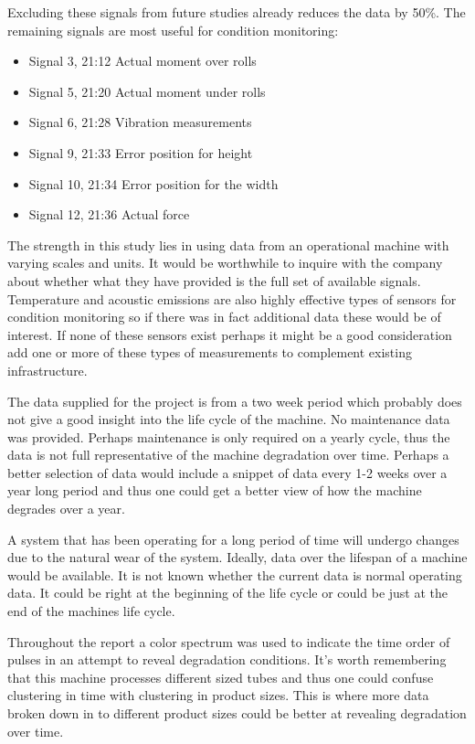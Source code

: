 \documentclass[]{article}
\begin{document}
Excluding these signals from future studies already reduces the data by 50\%. The remaining signals are most useful for condition monitoring:
\begin{itemize}
\item Signal 3, 21:12 Actual moment over rolls
\item Signal 5, 21:20 Actual moment under rolls
\item Signal 6, 21:28 Vibration measurements 
\item Signal 9, 21:33 Error position for height
\item Signal 10, 21:34 Error position for the width
\item Signal 12, 21:36 Actual force           
\end{itemize}

The strength in this study lies in using data from an operational machine with varying scales and units. It would be worthwhile to inquire with the company about whether what they have provided is the full set of available signals. Temperature and acoustic emissions are also highly effective types of sensors for condition monitoring so if there was in fact additional data these would be of interest. If none of these sensors exist perhaps it might be a good consideration add one or more of these types of measurements to complement existing infrastructure.

The data supplied for the project is from a two week period which probably does not give a good insight into the life cycle of the machine. No maintenance data was provided. Perhaps maintenance is only required on a yearly cycle, thus the data is not full representative of the machine degradation over time. Perhaps a better selection of data would include a snippet of data every 1-2 weeks over a year long period and thus one could get a better view of how the machine degrades over a year.

A system that has been operating for a long period of time will undergo changes due to the natural wear of the system. Ideally, data over the lifespan of a machine would be available. It is not known whether the current data is normal operating data. It could be right at the beginning of the life cycle or could be just at the end of the machines life cycle. 

Throughout the report a color spectrum was used to indicate the time order of pulses in an attempt to reveal degradation conditions. It's worth remembering that this machine processes different sized tubes and thus one could confuse clustering in time with clustering in product sizes. This is where more data broken down in to different product sizes could be better at revealing degradation over time.
\end{document}
